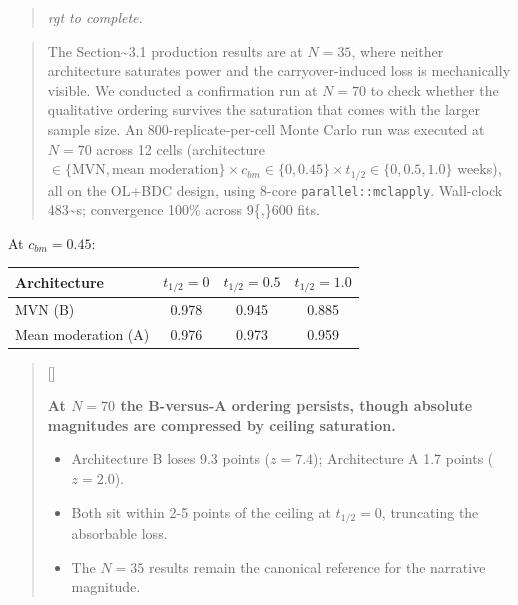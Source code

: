\documentclass[
  11pt,
]{article}
\newcounter{pgraph}
\newenvironment{bullets}{%
  \stepcounter{pgraph}%
  \begin{quote}\small\sffamily\color[gray]{0.30}%
  {\normalfont\scriptsize\color[gray]{0.58}[\thepgraph]\enspace}}{%
  \end{quote}}
\newenvironment{rgt}{%
  \begin{quote}\small\itshape\color[RGB]{20,60,160}}{%
  \end{quote}}
\newenvironment{orig}{%
  \begin{quote}\normalsize\color[gray]{0.55}}{%
  \end{quote}}
\begin{document}
\begin{rgt}
rgt to complete.

\end{rgt}

\begin{orig}
The Section\textasciitilde3.1 production results are at \(N = 35\),
where neither architecture saturates power and the carryover-induced
loss is mechanically visible. We conducted a confirmation run at
\(N = 70\) to check whether the qualitative ordering survives the
saturation that comes with the larger sample size. An
800-replicate-per-cell Monte Carlo run was executed at \(N = 70\) across
12 cells (architecture \(\in \{\text{MVN},
\text{mean moderation}\} \times c_{bm} \in \{0, 0.45\} \times
t_{1/2} \in \{0, 0.5, 1.0\}\) weeks), all on the OL+BDC design, using
8-core \texttt{parallel::mclapply}. Wall-clock 483\textasciitilde s;
convergence 100\% across 9\{,\}600 fits.

\end{orig}

At \(c_{bm} = 0.45\):

\begin{table}[htbp]
\centering
\begin{tabular}{lccc}
\toprule
Architecture        & $t_{1/2} = 0$ & $t_{1/2} = 0.5$ & $t_{1/2} = 1.0$ \\
\midrule
MVN (B)             & 0.978         & 0.945           & 0.885 \\
Mean moderation (A) & 0.976         & 0.973           & 0.959 \\
\bottomrule
\end{tabular}
\end{table}

\begin{bullets}

\textbf{At $N = 70$ the B-versus-A ordering persists, though
absolute magnitudes are compressed by ceiling saturation.}

\begin{itemize}\setlength{\itemsep}{2pt}\setlength{\parskip}{0pt}
\item Architecture B loses 9.3 points ($z = 7.4$); Architecture A
1.7 points ($z = 2.0$).
\item Both sit within 2-5 points of the ceiling at $t_{1/2} = 0$,
truncating the absorbable loss.
\item The $N = 35$ results remain the canonical reference for the
narrative magnitude.
\end{itemize}

\end{bullets}
\end{document}
